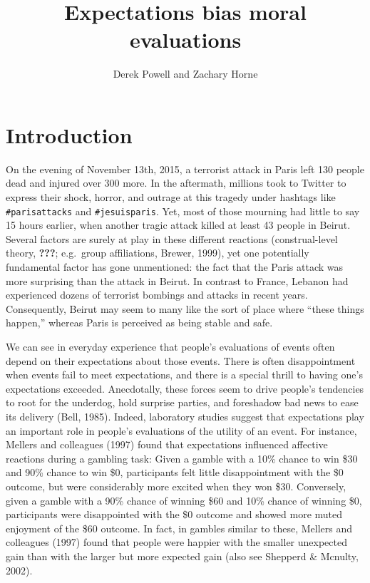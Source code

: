 \documentclass[]{article}
\title{Expectations bias moral evaluations}
\author{Derek Powell and Zachary Horne}
\date{}
\begin{document}
\maketitle

\section{Introduction}\label{introduction}

On the evening of November 13th, 2015, a terrorist attack in Paris left
130 people dead and injured over 300 more. In the aftermath, millions
took to Twitter to express their shock, horror, and outrage at this
tragedy under hashtags like \texttt{\#parisattacks} and
\texttt{\#jesuisparis}. Yet, most of those mourning had little to say 15
hours earlier, when another tragic attack killed at least 43 people in
Beirut. Several factors are surely at play in these different reactions
(construal-level theory, {\textbf{???}}; e.g.~group affiliations,
Brewer, 1999), yet one potentially fundamental factor has gone
unmentioned: the fact that the Paris attack was more surprising than the
attack in Beirut. In contrast to France, Lebanon had experienced dozens
of terrorist bombings and attacks in recent years. Consequently, Beirut
may seem to many like the sort of place where ``these things happen,''
whereas Paris is perceived as being stable and safe.

We can see in everyday experience that people's evaluations of events
often depend on their expectations about those events. There is often
disappointment when events fail to meet expectations, and there is a
special thrill to having one's expectations exceeded. Anecdotally, these
forces seem to drive people's tendencies to root for the underdog, hold
surprise parties, and foreshadow bad news to ease its delivery (Bell,
1985). Indeed, laboratory studies suggest that expectations play an
important role in people's evaluations of the utility of an event. For
instance, Mellers and colleagues (1997) found that expectations
influenced affective reactions during a gambling task: Given a gamble
with a 10\% chance to win \$30 and 90\% chance to win \$0, participants
felt little disappointment with the \$0 outcome, but were considerably
more excited when they won \$30. Conversely, given a gamble with a 90\%
chance of winning \$60 and 10\% chance of winning \$0, participants were
disappointed with the \$0 outcome and showed more muted enjoyment of the
\$60 outcome. In fact, in gambles similar to these, Mellers and
colleagues (1997) found that people were happier with the smaller
unexpected gain than with the larger but more expected gain (also see
Shepperd \& Mcnulty, 2002).
\end{document}

